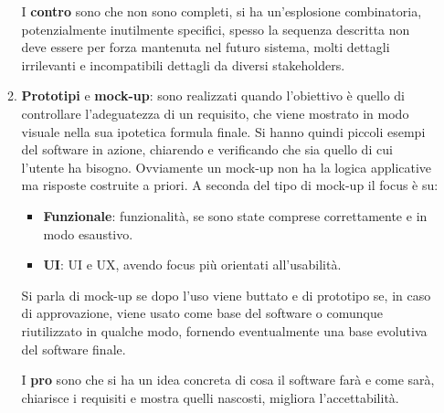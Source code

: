 \begin{itemize}
\begin{enumerate}
                        I \textbf{contro} sono che non sono completi, si ha
                        un'esplosione combinatoria, potenzialmente inutilmente
                        specifici, spesso la sequenza descritta non deve essere
                        per forza mantenuta nel futuro sistema, molti dettagli
                        irrilevanti e incompatibili dettagli da diversi
                        stakeholders.
                  \item \textbf{Prototipi} e \textbf{mock-up}: sono realizzati
                        quando l'obiettivo è quello di controllare l'adeguatezza
                        di un requisito, che viene mostrato in modo visuale nella
                        sua ipotetica formula finale. Si hanno quindi piccoli
                        esempi del software in azione, chiarendo e verificando
                        che sia quello di cui l'utente ha bisogno. Ovviamente un
                        mock-up non ha la logica applicative ma risposte costruite
                        a priori. A seconda del tipo di mock-up il focus è su:
                        \begin{itemize}
                              \item \textbf{Funzionale}: funzionalità, se sono
                                    state comprese correttamente e in modo
                                    esaustivo.
                              \item \textbf{UI}: UI e UX, avendo focus più
                                    orientati all'usabilità.
                        \end{itemize}
                        Si parla di mock-up se dopo l'uso viene buttato e di
                        prototipo se, in caso di approvazione, viene usato come
                        base del software o comunque riutilizzato in qualche modo,
                        fornendo eventualmente una base evolutiva del software
                        finale.

                        I \textbf{pro} sono che si ha un idea concreta di cosa
                        il software farà e come sarà, chiarisce i requisiti e
                        mostra quelli nascosti, migliora l'accettabilità.


\end{enumerate}
\end{itemize}
